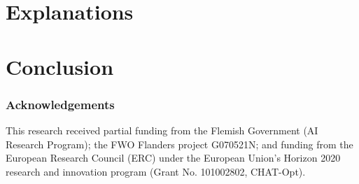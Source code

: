 \documentclass[runningheads]{llncs}
\begin{document}
\section{Explanations}

\section{Conclusion}

\subsubsection{Acknowledgements} This research received partial funding from the Flemish Government (AI Research Program); the FWO Flanders project G070521N; and funding from the European Research Council (ERC) under the European Union’s Horizon 2020 research and innovation program (Grant No. 101002802, CHAT-Opt).

%
%
%
 

\end{document}

